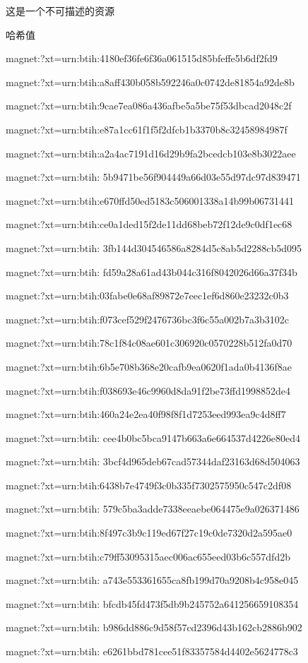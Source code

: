 \documentclass[UTF8]{ctexart}
\begin{document}
这是一个不可描述的资源
\par 哈希值
\par[1]magnet:?xt=urn:btih:4180ef36fe6f36a061515d85bfeffe5b6df2fd9
\par[2]magnet:?xt=urn:btih:a8aff430b058b592246a0c0742de81854a92de8b
\par[3]magnet:?xt=urn:btih:9cae7ea086a436afbe5a5be75f53dbcad2048c2f
\par[4]  magnet:?xt=urn:btih:e87a1cc61f1f5f2dfcb1b3370b8c32458984987f
\par[5]  magnet:?xt=urn:btih:a2a4ac7191d16d29b9fa2bcedcb103e8b3022aee
\par[6]  magnet:?xt=urn:btih:
5b9471be56f904449a66d03e55d97dc97d839471
\par[7]  magnet:?xt=urn:btih:e670ffd50ed5183c506001338a14b99b06731441
\par[8]  magnet:?xt=urn:btih:ce0a1ded15f2de11dd68beb72f12de9c0df1ec68
\par[9]  magnet:?xt=urn:btih:
3fb144d304546586a8284d5c8ab5d2288cb5d095
\par[10] magnet:?xt=urn:btih:
fd59a28a61ad43b044c316f8042026d66a37f34b
\par[11] magnet:?xt=urn:btih:03fabe0e68af89872e7eec1ef6d860e23232c0b3
\par[12] magnet:?xt=urn:btih:f073cef529f2476736bc3f6c55a002b7a3b3102c
\par[13] magnet:?xt=urn:btih:78c1f84c08ae601c306920c0570228b512fa0d70
\par[14] magnet:?xt=urn:btih:6b5e708b368e20cafb9ea0620f1ada0b4136f8ae
\par[15] magnet:?xt=urn:btih:f038693e46c9960d8da91f2be73ffd1998852de4
\par[16] magnet:?xt=urn:btih:460a24e2ea40f98f8f1d7253eed993ea9c4d8ff7
\par[17] magnet:?xt=urn:btih:
cee4b0bc5bca9147b663a6e664537d4226e80ed4
\par[18] magnet:?xt=urn:btih:
3bcf4d965deb67cad57344daf23163d68d504063
\par[19] magnet:?xt=urn:btih:6438b7e4749f3c0b335f7302575950c547c2df08
\par[20] magnet:?xt=urn:btih:
579c5ba3adde7338eeaebe064475e9a026371486
\par[21] magnet:?xt=urn:btih:8f497c3b9c119ed67f27c19c0de7320d2a595ae0
\par[22] magnet:?xt=urn:btih:c79ff53095315aec006ac655eed03b6c557dfd2b
\par[23] magnet:?xt=urn:btih:
a743e553361655ca8fb199d70a9208b4c958e045
\par[24] magnet:?xt=urn:btih:
bfcdb45fd473f5db9b245752a641256659108354
\par[25] magnet:?xt=urn:btih:
b986dd886c9d58f57cd2396d43b162cb2886b902
\par[26] magnet:?xt=urn:btih:
e6261bbd781cee51f83357584d4402e5624778c3
\end{document}
